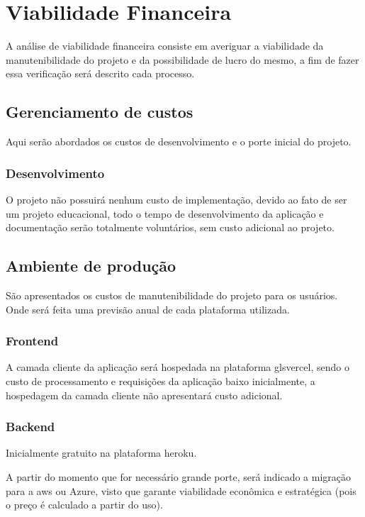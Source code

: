 \section{Viabilidade Financeira}
A análise de viabilidade financeira consiste em averiguar a viabilidade da manutenibilidade do projeto
e da possibilidade de lucro do mesmo, a fim de fazer essa verificação será descrito cada processo.

\subsection{Gerenciamento de custos}
Aqui serão abordados os custos de desenvolvimento e o porte inicial do projeto.

\subsubsection{Desenvolvimento}
O projeto não possuirá nenhum custo de implementação, devido ao fato de ser um projeto educacional,
todo o tempo de desenvolvimento da aplicação e documentação serão totalmente voluntários, sem custo adicional ao projeto.

\subsection{Ambiente de produção}
São apresentados os custos de manutenibilidade do projeto para os usuários. 
Onde será feita uma previsão anual de cada plataforma utilizada.

\subsubsection{Frontend}
A camada cliente da aplicação será hospedada na plataforma gls{vercel}, sendo o custo de processamento e requisições da aplicação
baixo inicialmente, a hospedagem da camada cliente não apresentará custo adicional.

\subsubsection{Backend}
Inicialmente gratuito na plataforma \gls{heroku}.

A partir do momento que for necessário grande porte, será indicado a migração para a \gls{aws} ou Azure,
visto que garante viabilidade econômica e estratégica (pois o
preço é calculado a partir do uso).

